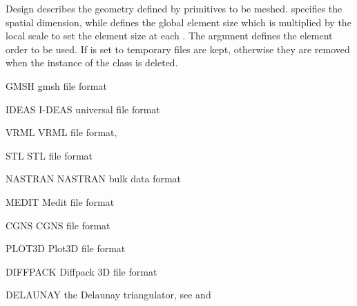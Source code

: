 \begin{classdesc}{Design}{
}
describes the geometry defined by primitives to be meshed.
 specifies the spatial dimension, while  defines
the global element size which is multiplied by the local scale to set the
element size at each \Point.
The argument  defines the element order to be used.
If  is set to \True temporary files are kept, otherwise they
are removed when the instance of the class is deleted.
\end{classdesc}

\begin{memberdesc}[Design]{GMSH}
gmsh file format~\cite{GMSH}
\end{memberdesc}

\begin{memberdesc}[Design]{IDEAS}
I-DEAS universal file format~\cite{IDEAS}
\end{memberdesc}

\begin{memberdesc}[Design]{VRML}
VRML file format, \cite{VRML}
\end{memberdesc}

\begin{memberdesc}[Design]{STL}
STL file format~\cite{STL}
\end{memberdesc}

\begin{memberdesc}[Design]{NASTRAN}
NASTRAN bulk data format~\cite{NASTRAN}
\end{memberdesc}

\begin{memberdesc}[Design]{MEDIT}
Medit file format~\cite{MEDIT}
\end{memberdesc}

\begin{memberdesc}[Design]{CGNS}
CGNS file format~\cite{CGNS}
\end{memberdesc}

\begin{memberdesc}[Design]{PLOT3D}
Plot3D file format~\cite{PLOT3D}
\end{memberdesc}

\begin{memberdesc}[Design]{DIFFPACK}
Diffpack 3D file format~\cite{DIFFPACK}
\end{memberdesc}

\begin{memberdesc}[Design]{DELAUNAY}
the Delaunay triangulator, see \gmshextern and \cite{TETGEN}
\end{memberdesc}

